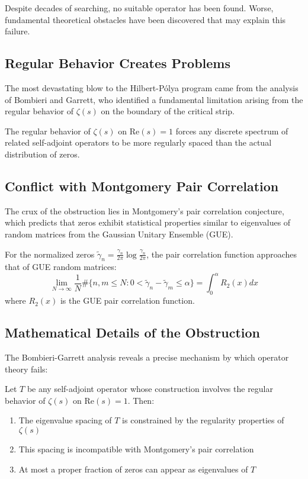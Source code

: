Despite decades of searching, no suitable operator has been found. Worse, fundamental theoretical obstacles have been discovered that may explain this failure.

\subsection{Regular Behavior Creates Problems}

The most devastating blow to the Hilbert-Pólya program came from the analysis of Bombieri and Garrett, who identified a fundamental limitation arising from the regular behavior of $\zeta(s)$ on the boundary of the critical strip.

\begin{theorem}
\label{thm:bombieri_garrett}
The regular behavior of $\zeta(s)$ on $\text{Re}(s) = 1$ forces any discrete spectrum of related self-adjoint operators to be more regularly spaced than the actual distribution of zeros.
\end{theorem}

\subsection{Conflict with Montgomery Pair Correlation}

The crux of the obstruction lies in Montgomery's pair correlation conjecture, which predicts that zeros exhibit statistical properties similar to eigenvalues of random matrices from the Gaussian Unitary Ensemble (GUE).

\begin{conjecture}
\label{conj:montgomery}
For the normalized zeros $\tilde{\gamma}_n = \frac{\gamma_n}{2\pi}\log\frac{\gamma_n}{2\pi}$, the pair correlation function approaches that of GUE random matrices:
$$\lim_{N \to \infty} \frac{1}{N} \#\{n,m \leq N : 0 < \tilde{\gamma}_n - \tilde{\gamma}_m \leq \alpha\} = \int_0^\alpha R_2(x) dx$$
where $R_2(x)$ is the GUE pair correlation function.
\end{conjecture}

\subsection{Mathematical Details of the Obstruction}

The Bombieri-Garrett analysis reveals a precise mechanism by which operator theory fails:

\begin{theorem}
\label{thm:spectral_spacing}
Let $T$ be any self-adjoint operator whose construction involves the regular behavior of $\zeta(s)$ on $\text{Re}(s) = 1$. Then:
\begin{enumerate}
\item The eigenvalue spacing of $T$ is constrained by the regularity properties of $\zeta(s)$
\item This spacing is incompatible with Montgomery's pair correlation
\item At most a proper fraction of zeros can appear as eigenvalues of $T$
\end{enumerate}
\end{theorem}

